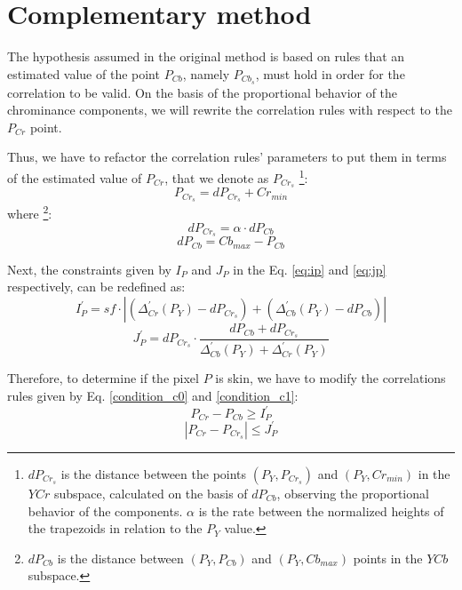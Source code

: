 \section{Complementary method}
\label{sec:proposed_method}
The hypothesis assumed in the original method is based on rules that an estimated value of the point $P_{Cb}$, namely $P_{Cb_s}$, must hold in order for the correlation to be valid. On the basis of the proportional behavior of the chrominance components, we will rewrite the correlation rules with respect to the $P_{Cr}$ point.

Thus, we have to refactor the correlation rules' parameters to put them in terms of the estimated value of $P_{Cr}$, that we denote as $P_{Cr_s}$ \footnote{$dP_{Cr_s}$ is the distance between the points $(P_Y, P_{Cr_s})$ and $(P_Y, Cr_{min})$ in the $YCr$ subspace, calculated on the basis of $dP_{Cb}$, observing the proportional behavior of the components. $\alpha$ is the rate between the normalized heights of the trapezoids in relation to the $P_Y$ value.}:
\begin{equation}
    P_{Cr_s} = dP_{Cr_s} + Cr_{min}
\end{equation}
where \footnote{$dP_{Cb}$ is the distance between $(P_Y, P_{Cb})$ and $(P_Y, Cb_{max})$ points in the $YCb$ subspace.}:
\begin{equation}
    dP_{Cr_s} = \alpha \cdot dP_{Cb}
\end{equation}
\begin{equation}
    dP_{Cb}   = Cb_{max} - P_{Cb}
\end{equation}

Next, the constraints given by $I_P$ and $J_P$ in the Eq. \ref{eq:ip} and \ref{eq:jp} respectively, can be redefined as:
\begin{equation}
    I^{'}_P = sf \cdot |(\Delta^{'}_{Cr}(P_Y) - dP_{Cr_s}) + (\Delta^{'}_{Cb}(P_Y) - dP_{Cb})|
\end{equation}
\begin{equation}
    J^{'}_P = dP_{Cr_s} \cdot \frac{dP_{Cb} + dP_{Cr_s}} {\Delta^{'}_{Cb}(P_Y) + \Delta^{'}_{Cr}(P_Y)}
\end{equation}

Therefore, to determine if the pixel $P$ is skin, we have to modify the correlations rules given by Eq. \ref{condition_c0} and \ref{condition_c1}:
\begin{equation}
    P_{Cr} - P_{Cb} \geq I^{'}_P
\label{condition_c00}
\end{equation}
\begin{equation}
   |P_{Cr} - P_{Cr_s}| \leq J^{'}_P
\label{condition_c11}
\end{equation}

